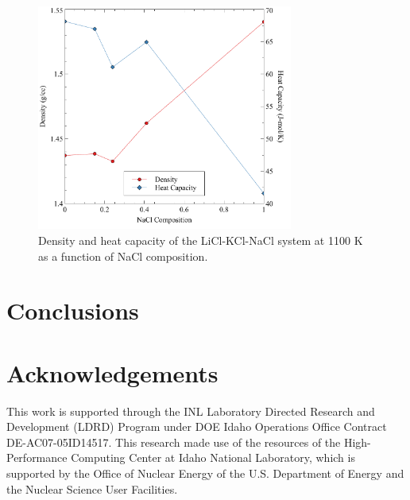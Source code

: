 \documentclass[review]{elsarticle}
\begin{document}
\begin{figure}[htbp]
\begin{center}
\includegraphics[width=0.75\textwidth]{./images/dens_cp_nacl.pdf}
\caption{Density and heat capacity of the LiCl-KCl-NaCl system at 1100 K as a function of NaCl composition.}
\label{default}
\end{center}
\end{figure}

\FloatBarrier

\section{Conclusions}


\section{Acknowledgements}

This work is supported through the INL Laboratory Directed Research and Development (LDRD) Program under DOE Idaho Operations Office Contract DE-AC07-05ID14517. This research made use of the resources of the High-Performance Computing Center at Idaho National Laboratory, which is supported by the Office of Nuclear Energy of the U.S. Department of Energy and the Nuclear Science User Facilities.  


\end{document}

